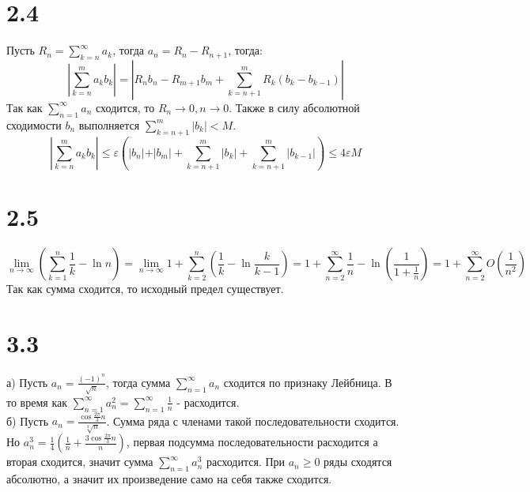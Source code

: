\documentclass[12pt]{article}
\begin{document}
\section{2.4}
Пусть $R_n = \sum_{k=n}^{\infty} a_k$, тогда $a_n = R_n - R_{n+1}$, тогда:
\[
    \left| \sum_{k=n}^{m} a_k b_k \right| = \left| R_n b_n - R_{m+1} b_m + \sum_{k=n+1}^{m} R_k(b_k - b_{k-1}) \right|
\]
Так как $\sum_{n=1}^{\infty} a_n$ сходится, то $R_n \to 0, n \to 0$. Также в силу абсолютной сходимости $b_n$ выполняется 
$\sum_{k=n+1}^{m} \vert b_k \vert < M$. 
\[
    \left| \sum_{k=n}^{m} a_k b_k \right| \leq \varepsilon \left( \vert b_n \vert + \vert b_m \vert + \sum_{k=n+1}^{m} \vert b_k \vert + \sum_{k=n+1}^{m} \vert b_{k-1} \vert \right) \leq  4 \varepsilon M 
\]

\section{2.5}
\[
    \lim_{n \to \infty} \left( \sum_{k=1}^{n} \frac{1}{k} - \ln n \right) = \lim_{n \to \infty} 1 + \sum_{k=2}^{n} \left( \frac{1}{k} - \ln \frac{k}{k-1} \right) = 
    1 + \sum_{n=2}^{\infty} \frac{1}{n} - \ln \left( \frac{1}{1 + \frac{1}{n}} \right) = 1 + \sum_{n=2}^{\infty} O(\frac{1}{n^2})  
\]
Так как сумма сходится, то исходный предел существует.

\section{3.3}
а) Пусть $a_n = \frac{(-1)^n}{\sqrt{n}}$, тогда сумма $\sum_{n=1}^{\infty} a_n$ сходится по признаку Лейбница. В то время как 
$\sum_{n=1}^{\infty} a_n^2 = \sum_{n=1}^{\infty} \frac{1}{n}$ - расходится. 
\\ б) Пусть $a_n = \frac{\cos \frac{2\pi}{3}n}{\sqrt[3]{n} }$. Сумма ряда с членами такой последовательности сходится. Но 
$a_n^3 = \frac{1}{4} \left( \frac{1}{n} + \frac{3\cos \frac{2\pi}{3}n}{n} \right)$, первая подсумма последовательности расходится а вторая сходится, 
значит сумма $\sum_{n=1}^{\infty} a_n^3$ расходится.  
При $a_n \geq 0$ ряды сходятся абсолютно, а значит их произведение само на себя также сходится. 
\end{document}
